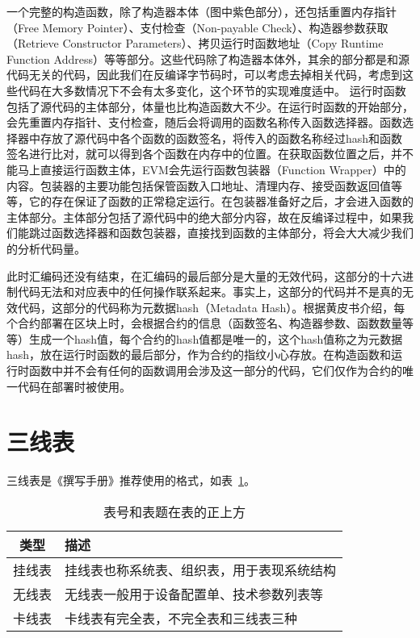 一个完整的构造函数，除了构造器本体（图中紫色部分），还包括重置内存指针（Free Memory Pointer）、支付检查（Non-payable Check）、构造器参数获取（Retrieve Constructor Parameters）、拷贝运行时函数地址（Copy Runtime Function Address）等等部分。这些代码除了构造器本体外，其余的部分都是和源代码无关的代码，因此我们在反编译字节码时，可以考虑去掉相关代码，考虑到这些代码在大多数情况下不会有太多变化，这个环节的实现难度适中。
运行时函数包括了源代码的主体部分，体量也比构造函数大不少。在运行时函数的开始部分，会先重置内存指针、支付检查，随后会将调用的函数名称传入函数选择器。函数选择器中存放了源代码中各个函数的函数签名，将传入的函数名称经过hash和函数签名进行比对，就可以得到各个函数在内存中的位置。在获取函数位置之后，并不能马上直接运行函数主体，EVM会先运行函数包装器（Function Wrapper）中的内容。包装器的主要功能包括保管函数入口地址、清理内存、接受函数返回值等等，它的存在保证了函数的正常稳定运行。在包装器准备好之后，才会进入函数的主体部分。主体部分包括了源代码中的绝大部分内容，故在反编译过程中，如果我们能跳过函数选择器和函数包装器，直接找到函数的主体部分，将会大大减少我们的分析代码量。

此时汇编码还没有结束，在汇编码的最后部分是大量的无效代码，这部分的十六进制代码无法和对应表中的任何操作联系起来。事实上，这部分的代码并不是真的无效代码，这部分的代码称为元数据hash（Metadata Hash）。根据黄皮书介绍，每个合约部署在区块上时，会根据合约的信息（函数签名、构造器参数、函数数量等等）生成一个hash值，每个合约的hash值都是唯一的，这个hash值称之为元数据hash，放在运行时函数的最后部分，作为合约的指纹小心存放。在构造函数和运行时函数中并不会有任何的函数调用会涉及这一部分的代码，它们仅作为合约的唯一代码在部署时被使用。

\section{三线表}

三线表是《撰写手册》推荐使用的格式，如表~\ref{tab:exampletable}。
\begin{table}[htb]
  \centering\small
  \caption{表号和表题在表的正上方}
  \label{tab:exampletable}
  \begin{tabular}{cl}
    \toprule
    类型   & 描述                                       \\
    \midrule
    挂线表 & 挂线表也称系统表、组织表，用于表现系统结构 \\
    无线表 & 无线表一般用于设备配置单、技术参数列表等   \\
    卡线表 & 卡线表有完全表，不完全表和三线表三种       \\
    \bottomrule
  \end{tabular}
\end{table}

